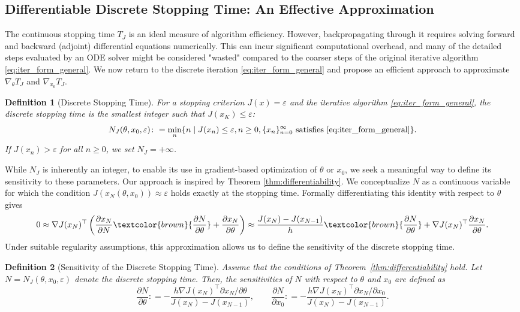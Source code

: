 \documentclass{article}
\newtheorem{definition}{Definition}
\begin{document}
\subsection{Differentiable Discrete Stopping Time: An Effective Approximation}
The continuous stopping time $T_J$ is an ideal measure of algorithm efficiency. However, backpropagating through it requires solving forward and backward (adjoint) differential equations numerically. This can incur significant computational overhead, and many of the detailed steps evaluated by an ODE solver might be considered "wasted" compared to the coarser steps of the original iterative algorithm \eqref{eq:iter_form_general}. We now return to the discrete iteration \eqref{eq:iter_form_general} and propose an efficient approach to approximate $\nabla_{\theta} T_J$ and $\nabla_{x_0} T_J$.
\begin{definition}[Discrete Stopping Time]
\label{def:discrete-stopping-time}
For a stopping criterion $J(x)=\varepsilon$ and the iterative algorithm \eqref{eq:iter_form_general}, the discrete stopping time is the smallest integer such that $J(x_K) \le \varepsilon$:
\begin{equation}
    N_J(\theta, x_0, \varepsilon)\colon=\min_{n}\{n\mid J(x_n) \le \varepsilon,n\geq 0,\{x_n\}_{n=0}^\infty \text{ satisfies \eqref{eq:iter_form_general}} \}.
\end{equation}
If $J(x_n) > \varepsilon$ for all $n \ge 0$, we set $N_J = +\infty$.
\end{definition}
While $N_J$ is inherently an integer, to enable its use in gradient-based optimization of $\theta$ or $x_0$, we seek a meaningful way to define its sensitivity to these parameters. Our approach is inspired by Theorem \ref{thm:differentiability}. We conceptualize $N$ as a continuous variable for which the condition $J(x_N(\theta, x_0)) \approx \varepsilon$ holds exactly at the stopping time. Formally differentiating this identity with respect to $\theta$ gives
$$
0\approx\nabla J(x_N)^\top \left( \frac{\partial x_N}{\partial N} \textcolor{brown}{\frac{\partial N}{\partial \theta}} + \frac{\partial x_N}{\partial \theta} \right)\approx \frac{J(x_N)-J(x_{N-1})}{h}\textcolor{brown}{\frac{\partial N}{\partial \theta}} + \nabla J(x_N)^\top\frac{\partial x_N}{\partial \theta} .
$$
Under suitable regularity assumptions, this approximation allows us to define the sensitivity of the discrete stopping time.

\begin{definition}[Sensitivity of the Discrete Stopping Time]
\label{def:sensitivity_N}
Assume that the conditions of Theorem~\ref{thm:differentiability} hold. Let $N = N_J(\theta, x_0, \varepsilon)$ denote the discrete stopping time. Then, the sensitivities of $N$ with respect to $\theta$ and $x_{0}$ are defined as
\begin{equation}
\label{eq:def-diff-stop-time}
\frac{\partial N}{\partial \theta} \colon= - \frac{h\nabla J(x_N)^\top {\partial x_N}/{\partial \theta}}{J(x_N) - J(x_{N-1})},\qquad
\frac{\partial N}{\partial x_{0}} \colon= - \frac{h\nabla J(x_N)^\top {\partial x_N}/{\partial x_{0}}}{J(x_N) - J(x_{N-1})}.
\end{equation}
\end{definition}
\end{document}
